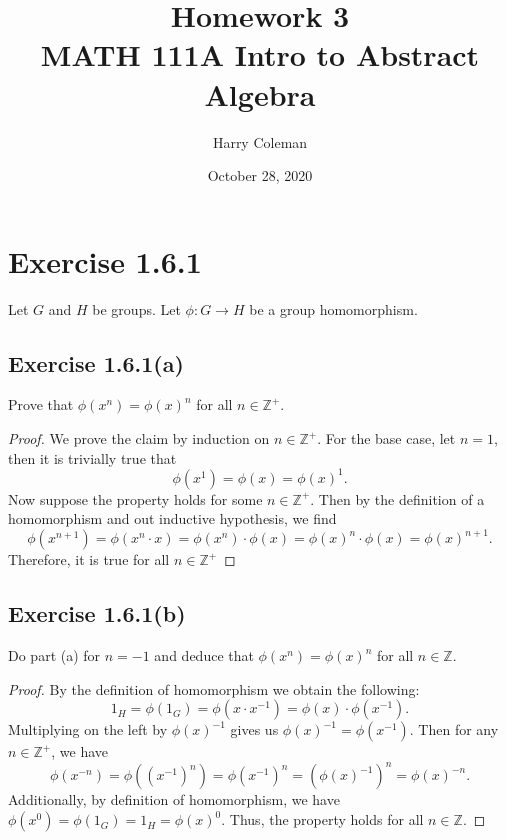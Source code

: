 \documentclass[12pt]{article}
\newenvironment{problem}
    {\begin{lrbox}{\mybox}\begin{minipage}{\textwidth-10pt}}
    {\end{minipage}\end{lrbox}\framebox[6.5in]{\usebox{\mybox}}}
\newcommand{\Z}{\mathbb{Z}}
\begin{document}
 
\title{Homework 3\\
    \large MATH 111A Intro to Abstract Algebra
}
\author{Harry Coleman}
\date{October 28, 2020}
\maketitle

\section*{Exercise 1.6.1}
\begin{problem}
    Let $G$ and $H$ be groups. Let $\phi:G\to H$ be a group homomorphism.
\end{problem}

\subsection*{Exercise 1.6.1(a)}
\begin{problem}
    Prove that $\phi(x^n) = \phi(x)^n$ for all $n\in\Z^+$.
\end{problem}

\begin{proof}
    We prove the claim by induction on $n\in\Z^+$. For the base case, let $n=1$, then it is trivially true that
    \[\phi(x^1) = \phi(x) = \phi(x)^1.\]
    Now suppose the property holds for some $n\in\Z^+$. Then by the definition of a homomorphism and out inductive hypothesis, we find
    \[\phi(x^{n+1}) = \phi(x^n\cdot x) = \phi(x^n)\cdot \phi(x) = \phi(x)^n\cdot \phi(x) = \phi(x)^{n+1}.\]
    Therefore, it is true for all $n\in\Z^+$
    
\end{proof}

\subsection*{Exercise 1.6.1(b)}
\begin{problem}
    Do part (a) for $n=-1$ and deduce that $\phi(x^n)=\phi(x)^n$ for all $n\in\Z$.
\end{problem}

\begin{proof}
    By the definition of homomorphism we obtain the following:
    \[1_H = \phi(1_G) = \phi(x\cdot x^{-1}) = \phi(x)\cdot\phi(x^{-1}).\]
    Multiplying on the left by $\phi(x)^{-1}$ gives us $\phi(x)^{-1}=\phi(x^{-1})$. Then for any $n\in\Z^+$, we have
    \[\phi(x^{-n}) = \phi((x^{-1})^n) = \phi(x^{-1})^n = (\phi(x)^{-1})^n = \phi(x)^{-n}.\]
    Additionally, by definition of homomorphism, we have $\phi(x^0) = \phi(1_G) = 1_H = \phi(x)^0$. Thus, the property holds for all $n\in\Z$.
    
\end{proof}
\end{document}

